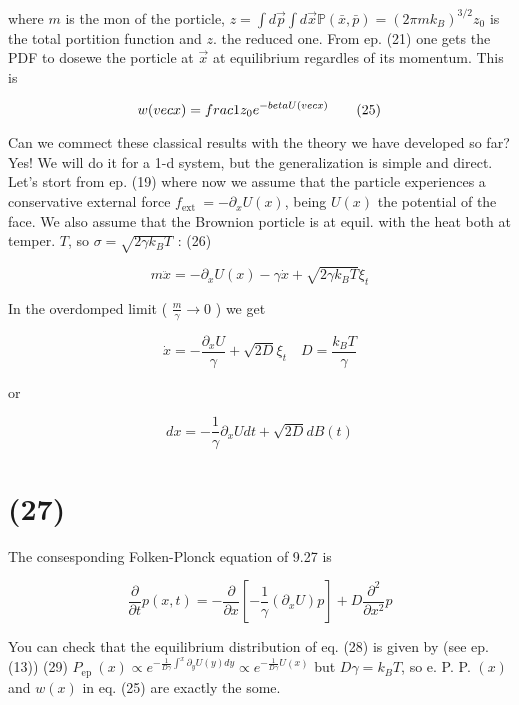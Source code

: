 where $m$ is the mon of the porticle, $z=\int d \vec{p} \int d \vec{x} \mathbb{P}(\bar{x}, \bar{p})=\left(2 \pi m k_{B}\right)^{3 / 2} z_{0}$ is the total portition function and $z$. the reduced one. From ep. (21) one gets the PDF to dosewe the porticle at $\vec{x}$ at equilibrium regardles of its momentum. This is


\begin{equation*}
w(\\vec{x})=\\frac{1}{z_{0}} e^{-\\beta U(\\vec{x})} \tag{25}
\end{equation*}

Can we commect these classical results with the theory we have developed so far? Yes! We will do it for a 1-d system, but the generalization is simple and direct. Let's stort from ep. (19) where now we assume that the particle experiences a conservative external force $f_{\text {ext }}=-\partial_{x} U(x)$, being $U(x)$ the potential of the face. We also assume that the Brownion porticle is at equil. with the heat both at temper. $T$, so $\sigma=\sqrt{2 \gamma k_{B} T}$ :
(26)

$$ m \ddot{x}=-\partial_{x} U(x)-\gamma \dot{x}+\sqrt{2 \gamma k_{B} T} \xi_{t} $$

In the overdomped limit ( $\frac{m}{\gamma} \rightarrow 0$ ) we get


\begin{equation*}
\dot{x}=-\frac{\partial_{x} U}{\gamma}+\sqrt{2 D} \xi_{t} \quad D=\frac{k_{B} T}{\gamma} \tag{23}
\end{equation*}

or

$$ d x=-\frac{1}{\gamma} \partial_{x} U d t+\sqrt{2 D} d B(t) $$

\section*{(27)}
The consesponding Folken-Plonck equation of 9.27 is


\begin{equation*}
\frac{\partial}{\partial t} p(x, t)=-\frac{\partial}{\partial x}\left[-\frac{1}{\gamma}\left(\partial_{x} U\right) p\right]+D \frac{\partial^{2}}{\partial x^{2}} p \tag{28}
\end{equation*}

You can check that the equilibrium distribution of eq. (28) is given by (see ep. (13))
(29) $P_{\text {ep }}(x) \propto e^{-\frac{1}{D \gamma} \int^{x} \partial_{y} U(y) d y} \propto e^{-\frac{1}{D \gamma} U(x)}$
but $D \gamma=k_{B} T$, so e. P. P. $(x)$ and $w(x)$ in eq. (25) are exactly the some.

